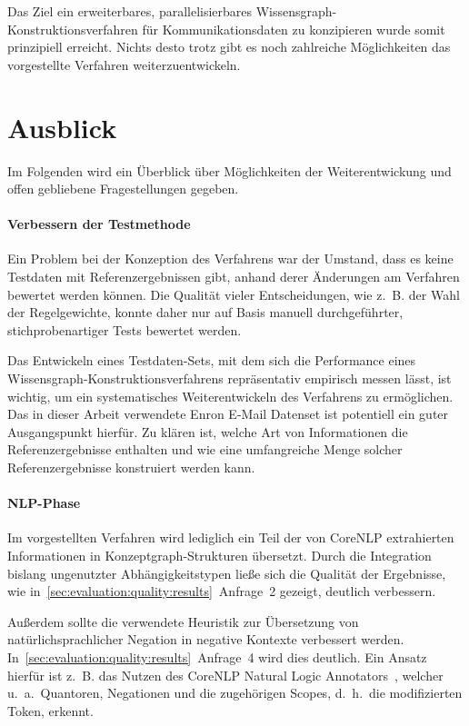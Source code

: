 Das Ziel ein erweiterbares, parallelisierbares Wissensgraph-Konstruktionsverfahren für Kommunikationsdaten zu konzipieren wurde somit prinzipiell erreicht.
Nichts desto trotz gibt es noch zahlreiche Möglichkeiten das vorgestellte Verfahren weiterzuentwickeln.

\section{Ausblick}%
\label{sec:conclusion:todo}

Im Folgenden wird ein Überblick über Möglichkeiten der Weiterentwickung und offen gebliebene Fragestellungen gegeben.

\paragraph{Verbessern der Testmethode}
Ein Problem bei der Konzeption des Verfahrens war der Umstand, dass es keine Testdaten mit Referenzergebnissen gibt, anhand derer Änderungen am Verfahren bewertet werden können.
Die Qualität vieler Entscheidungen, wie z.~B. der Wahl der Regelgewichte, konnte daher nur auf Basis manuell durchgeführter, stichprobenartiger Tests bewertet werden.

Das Entwickeln eines Testdaten-Sets, mit dem sich die Performance eines Wissensgraph-Konstruktionsverfahrens repräsentativ empirisch messen lässt, ist wichtig, um ein systematisches Weiterentwickeln des Verfahrens zu ermöglichen.
Das in dieser Arbeit verwendete Enron E-Mail Datenset ist potentiell ein guter Ausgangspunkt hierfür.
Zu klären ist, welche Art von Informationen die Referenzergebnisse enthalten und wie eine umfangreiche Menge solcher Referenzergebnisse konstruiert werden kann.

\paragraph{NLP-Phase}
Im vorgestellten Verfahren wird lediglich ein Teil der von CoreNLP extrahierten Informationen in Konzeptgraph-Strukturen übersetzt.
Durch die Integration bislang ungenutzter Abhängigkeitstypen ließe sich die Qualität der Ergebnisse, wie in~\ref{sec:evaluation:quality:results}~Anfrage~2 gezeigt, deutlich verbessern.

Außerdem sollte die verwendete Heuristik zur Übersetzung von natürlichsprachlicher Negation in negative Kontexte verbessert werden.
In~\ref{sec:evaluation:quality:results}~Anfrage~4 wird dies deutlich.
Ein Ansatz hierfür ist z.~B. das Nutzen des CoreNLP Natural Logic Annotators~\cite{MacCartney2007}, welcher u.~a.\ Quantoren, Negationen und die zugehörigen Scopes, d.~h.\ die modifizierten Token, erkennt.


